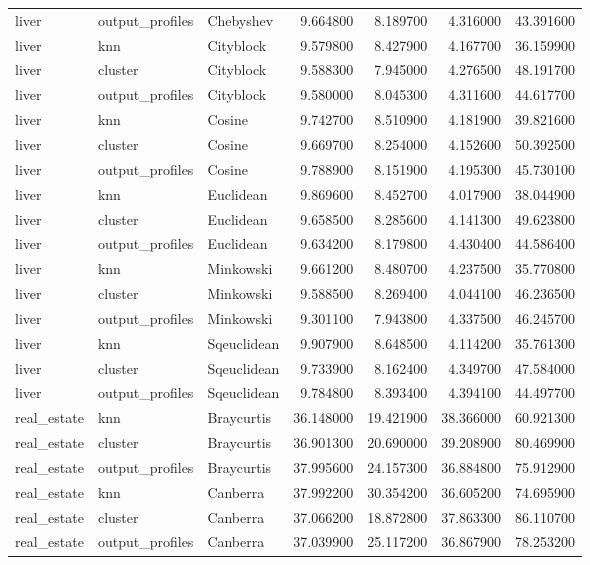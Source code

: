 \begin{tabular}{lllrrrr}
liver & output\_profiles & Chebyshev & 9.664800 & 8.189700 & 4.316000 & 43.391600 \\
liver & knn & Cityblock & 9.579800 & 8.427900 & 4.167700 & 36.159900 \\
liver & cluster & Cityblock & 9.588300 & 7.945000 & 4.276500 & 48.191700 \\
liver & output\_profiles & Cityblock & 9.580000 & 8.045300 & 4.311600 & 44.617700 \\
liver & knn & Cosine & 9.742700 & 8.510900 & 4.181900 & 39.821600 \\
liver & cluster & Cosine & 9.669700 & 8.254000 & 4.152600 & 50.392500 \\
liver & output\_profiles & Cosine & 9.788900 & 8.151900 & 4.195300 & 45.730100 \\
liver & knn & Euclidean & 9.869600 & 8.452700 & 4.017900 & 38.044900 \\
liver & cluster & Euclidean & 9.658500 & 8.285600 & 4.141300 & 49.623800 \\
liver & output\_profiles & Euclidean & 9.634200 & 8.179800 & 4.430400 & 44.586400 \\
liver & knn & Minkowski & 9.661200 & 8.480700 & 4.237500 & 35.770800 \\
liver & cluster & Minkowski & 9.588500 & 8.269400 & 4.044100 & 46.236500 \\
liver & output\_profiles & Minkowski & 9.301100 & 7.943800 & 4.337500 & 46.245700 \\
liver & knn & Sqeuclidean & 9.907900 & 8.648500 & 4.114200 & 35.761300 \\
liver & cluster & Sqeuclidean & 9.733900 & 8.162400 & 4.349700 & 47.584000 \\
liver & output\_profiles & Sqeuclidean & 9.784800 & 8.393400 & 4.394100 & 44.497700 \\
real\_estate & knn & Braycurtis & 36.148000 & 19.421900 & 38.366000 & 60.921300 \\
real\_estate & cluster & Braycurtis & 36.901300 & 20.690000 & 39.208900 & 80.469900 \\
real\_estate & output\_profiles & Braycurtis & 37.995600 & 24.157300 & 36.884800 & 75.912900 \\
real\_estate & knn & Canberra & 37.992200 & 30.354200 & 36.605200 & 74.695900 \\
real\_estate & cluster & Canberra & 37.066200 & 18.872800 & 37.863300 & 86.110700 \\
real\_estate & output\_profiles & Canberra & 37.039900 & 25.117200 & 36.867900 & 78.253200 \\

\end{tabular}
